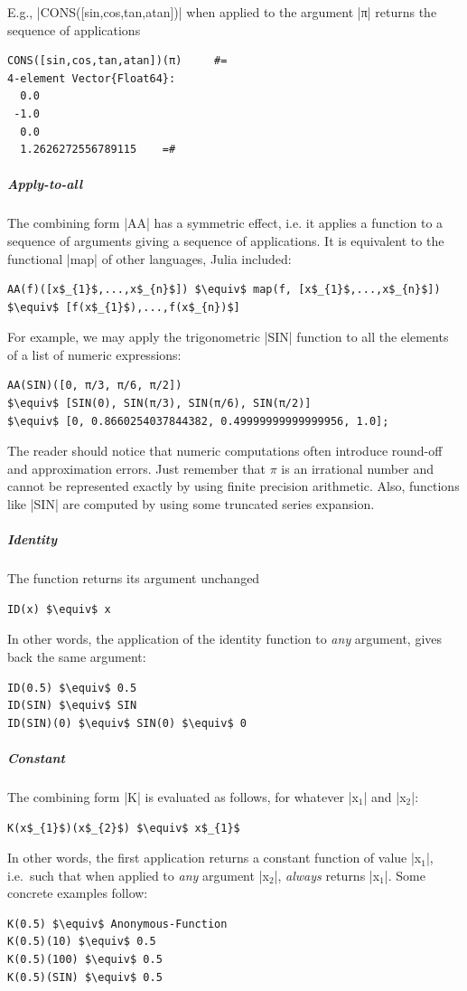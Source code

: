 E.g., |CONS([sin,cos,tan,atan])| when applied
to the argument |π| returns the sequence of applications
\begin{lstlisting}[language=JuliaLocal, style=julia, mathescape = true]
CONS([sin,cos,tan,atan])(π) 	#=
4-element Vector{Float64}:
  0.0
 -1.0
  0.0
  1.2626272556789115 	=#
\end{lstlisting}

\subparagraph{Apply-to-all}
The combining form |AA| has a symmetric effect, i.e. it
applies a function to a sequence of arguments giving a sequence of applications. It is equivalent to the functional |map|  of other languages, Julia included:
\begin{lstlisting}[language=JuliaLocal, style=julia, mathescape = true] 
AA(f)([x$_{1}$,...,x$_{n}$]) $\equiv$ map(f, [x$_{1}$,...,x$_{n}$]) $\equiv$ [f(x$_{1}$),...,f(x$_{n})$]
\end{lstlisting}
For example, we may apply the trigonometric |SIN| function to all the elements of a 
list of numeric expressions:
\begin{lstlisting}[language=JuliaLocal, style=julia, mathescape = true] 
AA(SIN)([0, π/3, π/6, π/2]) 
$\equiv$ [SIN(0), SIN(π/3), SIN(π/6), SIN(π/2)]
$\equiv$ [0, 0.8660254037844382, 0.49999999999999956, 1.0];
\end{lstlisting}
The reader should notice that numeric computations often introduce
round-off and approximation errors.  Just remember that $\pi$ is an
irrational number and cannot be represented exactly by using finite
precision arithmetic.  Also, functions like |SIN| are computed
by using some truncated series expansion.

\subparagraph{Identity}
The function  returns its argument unchanged
\begin{lstlisting}[language=JuliaLocal, style=julia, mathescape = true] 
ID(x) $\equiv$ x
\end{lstlisting}
In other words, the application of the identity function to \emph{any} argument, 
gives back the same argument:
\begin{lstlisting}[language=JuliaLocal, style=julia, mathescape = true] 
ID(0.5) $\equiv$ 0.5
ID(SIN) $\equiv$ SIN  
ID(SIN)(0) $\equiv$ SIN(0) $\equiv$ 0 
\end{lstlisting}


\subparagraph{Constant}

The combining form |K| is evaluated as follows, for
whatever |x$_{1}$| and |x$_{2}$|: 
\begin{lstlisting}[language=JuliaLocal, style=julia, mathescape = true]
K(x$_{1}$)(x$_{2}$) $\equiv$ x$_{1}$
\end{lstlisting}
In other words, the first application returns a constant function of
value |x$_{1}$|, i.e.~such that when applied to \emph{any}
argument |x$_{2}$|, \emph{always} returns |x$_{1}$|. 
Some concrete examples follow:
\begin{lstlisting}[language=JuliaLocal, style=julia, mathescape = true] 
K(0.5) $\equiv$ Anonymous-Function 
K(0.5)(10) $\equiv$ 0.5 
K(0.5)(100) $\equiv$ 0.5 
K(0.5)(SIN) $\equiv$ 0.5 
\end{lstlisting}


